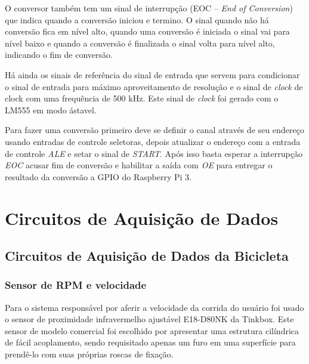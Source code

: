	O conversor também tem um sinal de interrupção (EOC – \textit{End of Conversion}) que indica quando a conversão iniciou e termino. O sinal quando não há conversão fica em nível alto, quando uma conversão é iniciada o sinal vai para nível baixo e quando a conversão é finalizada o sinal volta para nível alto, indicando o fim de conversão.

	Há ainda os sinais de referência do sinal de entrada que servem para condicionar o sinal de entrada para máximo aproveitamento de resolução e o sinal de \textit{clock} de clock com uma frequência de 500 kHz. Este sinal de \textit{clock} foi gerado com o LM555 em modo ástavel. 

	Para fazer uma conversão primeiro deve se definir o canal através de seu endereço usando entradas de controle seletoras, depois atualizar o endereço com a entrada de controle \textit{ALE} e setar o sinal de \textit{START}. Após isso basta esperar a interrupção \textit{EOC} acusar fim de conversão e habilitar a saída com \textit{OE} para entregar o resultado da conversão a GPIO do Raspberry Pi 3.



\section{Circuitos de Aquisição de Dados}

\subsection{Circuitos de Aquisição de Dados da Bicicleta}

\subsubsection{Sensor de RPM e velocidade}    

		Para o sistema responsável por aferir a velocidade da corrida do usuário foi usado o sensor de proximidade infravermelho ajustável E18-D80NK da Tinkbox. Este sensor de modelo comercial foi escolhido por apresentar uma estrutura cilíndrica de fácil acoplamento, sendo requisitado apenas um furo em uma superfície para prendê-lo com suas próprias roscas de fixação.
        
